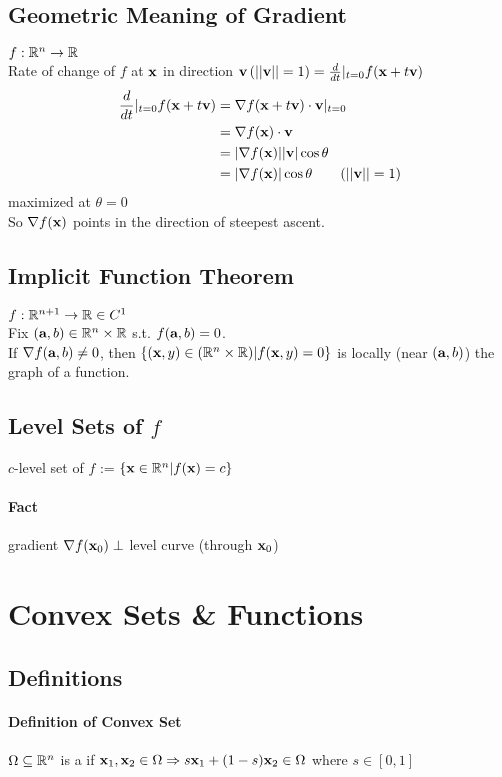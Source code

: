 \documentclass[11pt]{article}
\begin{document}
\subsection{Geometric Meaning of Gradient}
$f: \mathbb{R}^n \rightarrow \mathbb{R}$\\
Rate of change of $f$ at $\textbf{x}$ in direction $\textbf{v} \, (||\textbf{v}||=1) = \frac{d}{dt}|_{t=0}f(\textbf{x} + t\textbf{v})$
\begin{align*}
	\frac{d}{dt}|_{t=0}f(\vx + t\vv) &= \nabla f(\vx + t\vv) \cdot \vv |_{t=0} \\
	&= \nabla f(\vx)\cdot \vv \\
	&= |\nabla f(\vx)| |\vv| \cos \theta\\
	&= |\nabla f(\vx)| \cos \theta \tag{$||\vv||  = 1$}
\end{align*}
maximized at $\theta = 0$ \\
So $\nabla f(\textbf{x})$ points in the direction of steepest ascent.

\subsection{Implicit Function Theorem}
$f: \mathbb{R}^{n+1} \rightarrow \mathbb{R} \in C^1$ \\
Fix $(\textbf{a},b) \in \mathbb{R}^n \times \mathbb{R}$ s.t. $f(\textbf{a},b) = 0$. \\
If $\nabla f(\textbf{a},b) \neq 0$, then $\{(\textbf{x}, y) \in (\mathbb{R}^n \times \mathbb{R}) | f(\textbf{x}, y) = 0\}$ is locally (near $(\textbf{a}, b)$) the graph of a function.

\subsection{Level Sets of $f$}
$c$-level set of $f$ := $\{ \textbf{x} \in \mathbb{R}^n | f(\textbf{x}) = c\}$
\paragraph{Fact} gradient $\nabla f(\textbf{x}_0) \perp$ level curve (through $\textbf{x}_0$)

\section{Convex Sets \& Functions}
\subsection{Definitions}
\paragraph{Definition of Convex Set}
$\Omega \subseteq \mathbb{R}^n$ is a  if
$\textbf{x}_1, \textbf{x}_2 \in \Omega \Rightarrow s\textbf{x}_1 + (1-s)\textbf{x}_2 \in \Omega$ where $s \in [0,1]$
\end{document}
